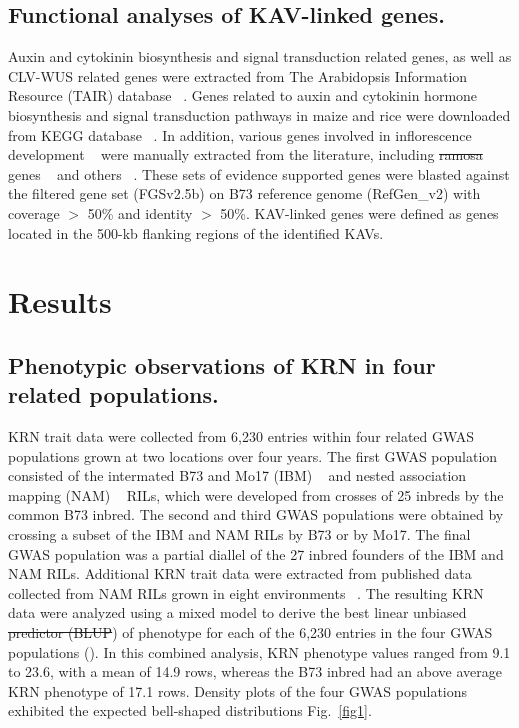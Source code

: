\documentclass[10pt,letterpaper]{article}
\providecommand{\DIFaddtex}[1]{{\protect\color{blue}\uwave{#1}}} %
\providecommand{\DIFdeltex}[1]{{\protect\color{red}\sout{#1}}}                      %
\providecommand{\DIFaddbegin}{} %
\providecommand{\DIFaddend}{} %
\providecommand{\DIFdelbegin}{} %
\providecommand{\DIFdelend}{} %
\providecommand{\DIFadd}[1]{\texorpdfstring{\DIFaddtex{#1}}{#1}} %
\providecommand{\DIFdel}[1]{\texorpdfstring{\DIFdeltex{#1}}{}} %
\begin{document}
\subsection*{Functional analyses of KAV-linked genes.} 
Auxin and cytokinin biosynthesis and signal transduction related genes, as well as CLV-WUS related genes were extracted from The Arabidopsis Information Resource (TAIR) database ~\cite{Poole2007}. Genes related to auxin and cytokinin hormone biosynthesis and signal transduction pathways in maize and rice were downloaded from KEGG database ~\cite{Kanehisa2002}. In addition, various genes involved in inflorescence development ~\cite{Barazesh2008} were manually extracted from the literature, including \DIFdelbegin \DIFdel{ramosa }\DIFdelend \DIFaddbegin \emph{\DIFadd{ramosa}} \DIFaddend genes ~\cite{Bortiri2006} and others ~\cite{McSteen2001, Upadyayula2006, Xu2011}. These sets of evidence supported genes were blasted against the filtered gene set (FGSv2.5b) on B73 reference genome (RefGen\_v2) with coverage $>$ 50\% and identity $>$ 50\%. KAV-linked genes were defined as genes located in the 500-kb flanking regions of the identified KAVs.


\section*{Results}
\subsection*{Phenotypic observations of KRN in four related populations.}

KRN trait data were collected from 6,230 entries within four related GWAS populations grown at two locations over four years. The first GWAS population consisted of the intermated B73 and Mo17 (IBM) ~\cite{Lee2002} and nested association mapping (NAM) ~\cite{Yu2008} RILs, which were developed from crosses of 25 inbreds by the common B73 inbred. The second and third GWAS populations were obtained by crossing a subset of the IBM and NAM RILs by B73 or by Mo17.  The final GWAS population was a partial diallel of the 27 inbred founders of the IBM and NAM RILs. Additional KRN trait data were extracted from published data collected from NAM RILs grown in eight environments ~\cite{Brown2011}. The resulting KRN data were analyzed using a mixed model to derive the best linear unbiased \DIFdelbegin \DIFdel{predictor (BLUP}\DIFdelend \DIFaddbegin \DIFadd{estimators (BLUE}\DIFaddend ) of phenotype for each of the 6,230 entries in the four GWAS populations (). In this combined analysis, KRN phenotype values ranged from 9.1 to 23.6, with a mean of 14.9 rows, whereas the B73 inbred had an above average KRN phenotype of 17.1 rows. Density plots of the four GWAS populations exhibited the expected bell-shaped distributions Fig.~\ref{fig1}.
\end{document}
